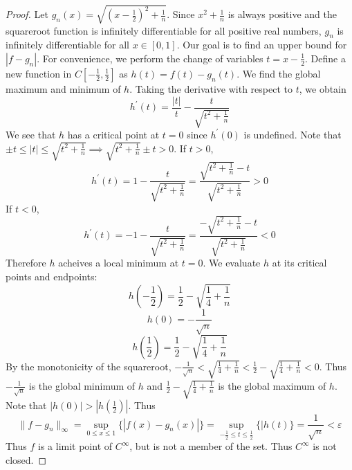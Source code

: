 \documentclass{article}
\theoremstyle{plain} %
\numberwithin{thm}{section} %
\theoremstyle{definition}
\begin{document}
\begin{enumerate}[label=(\alph*)]
\begin{proof}
                Let \(g_n(x) = \sqrt{(x-\frac{1}{2})^2 + \frac{1}{n}}\). Since \(x^2 + \frac{1}{n}\) is always positive and the squareroot function is infinitely differentiable for all positive real numbers, \(g_n\) is infinitely differentiable for all \(x \in [0,1]\). Our goal is to find an upper bound for \(|f - g_n|\). For convenience, we perform the change of variables \(t = x - \frac{1}{2}\). Define a new function in \(C[-\frac{1}{2},\frac{1}{2}]\) as \(h(t) = f(t) - g_n(t)\). We find the global maximum and minimum of \(h\). Taking the derivative with respect to \(t\), we obtain
                \[
                    h^\prime (t) = \frac{|t|}{t} - \frac{t}{\sqrt{t^2 + \frac{1}{n}}}
                \]
                We see that \(h\) has a critical point at \(t = 0\) since \(h^\prime(0)\) is undefined.
                Note that \(\pm t \leq  |t| \leq \sqrt{t^2 + \frac{1}{n}} \implies \sqrt{t^2 + \frac{1}{n}} \pm t > 0\). If \(t > 0\),
                \[
                    h^\prime (t) = 1 - \frac{t}{\sqrt{t^2 + \frac{1}{n}}} = \frac{\sqrt{t^2 + \frac{1}{n}} - t}{\sqrt{t^2 + \frac{1}{n}}} > 0
                \]
                If \(t < 0\),
                \[
                    h^\prime (t) = -1 - \frac{t}{\sqrt{t^2 + \frac{1}{n}}} = \frac{-\sqrt{t^2 + \frac{1}{n}} - t}{\sqrt{t^2 + \frac{1}{n}}} < 0
                \]
                Therefore \(h\) acheives a local minimum at \(t = 0\).
                We evaluate \(h\) at its critical points and endpoints:
                \[
                    h\left(-\frac{1}{2}\right) = \frac{1}{2} - \sqrt{\frac{1}{4}+\frac{1}{n}}
                \]
                \[
                    h(0) = -\frac{1}{\sqrt{n}}
                \]
                \[
                    h\left(\frac{1}{2}\right) = \frac{1}{2} - \sqrt{\frac{1}{4}+\frac{1}{n}}
                \]
                By the monotonicity of the squareroot, \(-\frac{1}{\sqrt{n}} < \sqrt{\frac{1}{4} + \frac{1}{n}} < \frac{1}{2} - \sqrt{\frac{1}{4} + \frac{1}{n}} < 0\). Thus \(-\frac{1}{\sqrt{n}}\) is the global minimum of \(h\) and \(\frac{1}{2} - \sqrt{\frac{1}{4} + \frac{1}{n}}\) is the global maximum of \(h\). Note that \(|h(0)| > |h(\frac{1}{2})|\). Thus
                \[
                    \|f-g_n\| _\infty = \sup_{0\leq x\leq 1}\{|f(x)-g_n(x)|\} = \sup_{-\frac{1}{2} \leq t \leq \frac{1}{2}} \{|h(t)\} = \frac{1}{\sqrt{n}} < \varepsilon
                \]
                Thus \(f\) is a limit point of \(C^{\infty}\), but is not a member of the set. Thus \(C^{\infty}\) is not closed.
    
            \end{proof}
    

\end{enumerate}
\end{document}
